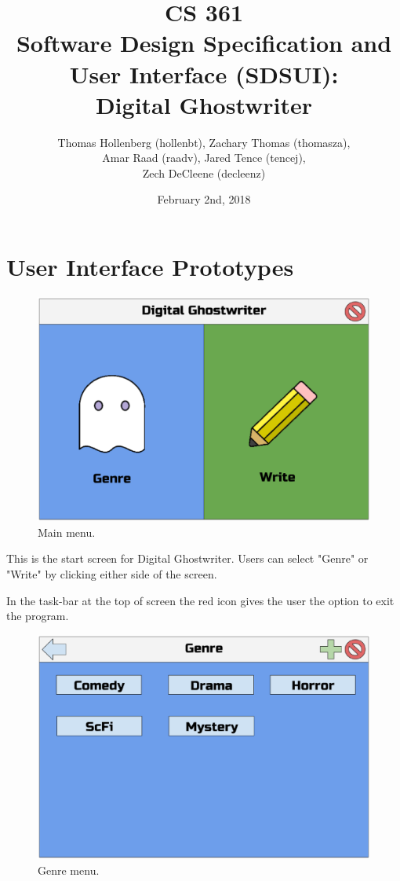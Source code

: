 \documentclass[12pt]{article}
\title{CS 361 \\ Software Design Specification and User Interface (SDSUI): \\ Digital Ghostwriter}
\author{Thomas Hollenberg (hollenbt), Zachary Thomas (thomasza),\\ Amar Raad (raadv), Jared Tence (tencej), \\  Zech DeCleene (decleenz)}
\date{February 2nd, 2018}
\begin{document}
\maketitle
\newpage
\tableofcontents

\newpage

\section{User Interface Prototypes}

\begin{figure}[ht]
  \centering
    \includegraphics[scale=0.5]{GW.eps}
    \caption{Main menu.}
\end{figure}

This is the start screen for Digital Ghostwriter.
Users can select "Genre" or "Write" by clicking either side of the screen.

In the task-bar at the top of screen the red icon gives the user the option to exit the program.

\newpage

\begin{figure}[ht]
  \centering
    \includegraphics[scale=0.5]{G1.eps}
    \caption{Genre menu.}
\end{figure}
\end{document}
